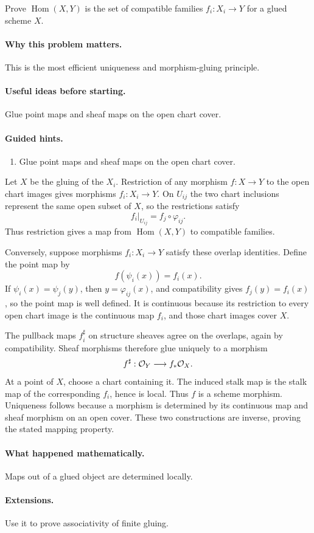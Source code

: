 \begin{problem}\label{prob:vi20-p04}
Prove $\operatorname{Hom}(X,Y)$ is the set of compatible families $f_i:X_i\to Y$ for a glued scheme $X$.
\end{problem}

\ifdefined\FullProblemDossiers
\paragraph{Why this problem matters.}
This is the most efficient uniqueness and morphism-gluing principle.

\paragraph{Useful ideas before starting.}
Glue point maps and sheaf maps on the open chart cover.

\paragraph{Guided hints.}
\begin{enumerate}
\item Glue point maps and sheaf maps on the open chart cover.
\end{enumerate}

\begin{solution}
Let $X$ be the gluing of the $X_i$.  Restriction of any morphism $f:X\to Y$ to the open chart images gives morphisms $f_i:X_i\to Y$.  On $U_{ij}$ the two chart inclusions represent the same open subset of $X$, so the restrictions satisfy
\[
f_i|_{U_{ij}}=f_j\circ\varphi_{ij}.
\]
Thus restriction gives a map from $\operatorname{Hom}(X,Y)$ to compatible families.

Conversely, suppose morphisms $f_i:X_i\to Y$ satisfy these overlap identities.  Define the point map by
\[
f(\psi_i(x))=f_i(x).
\]
If $\psi_i(x)=\psi_j(y)$, then $y=\varphi_{ij}(x)$, and compatibility gives $f_j(y)=f_i(x)$, so the point map is well defined.  It is continuous because its restriction to every open chart image is the continuous map $f_i$, and those chart images cover $X$.

The pullback maps $f_i^\sharp$ on structure sheaves agree on the overlaps, again by compatibility.  Sheaf morphisms therefore glue uniquely to a morphism
\[
f^\sharp:\mathcal O_Y\longrightarrow f_*\mathcal O_X.
\]
At a point of $X$, choose a chart containing it.  The induced stalk map is the stalk map of the corresponding $f_i$, hence is local.  Thus $f$ is a scheme morphism.  Uniqueness follows because a morphism is determined by its continuous map and sheaf morphism on an open cover.  These two constructions are inverse, proving the stated mapping property.
\end{solution}


\paragraph{What happened mathematically.}
Maps out of a glued object are determined locally.

\paragraph{Extensions.}
Use it to prove associativity of finite gluing.
\fi
